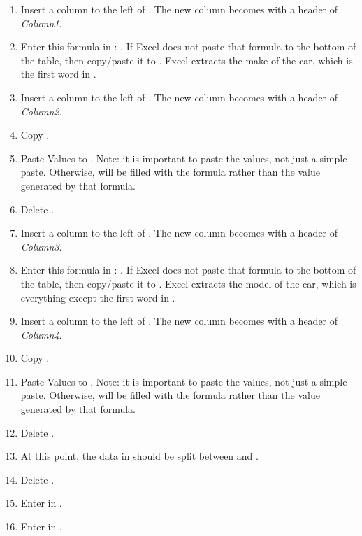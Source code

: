 \begin{enumerate}[resume]
	\begin{enumerate}
		\item Insert a column to the left of . The new column becomes  with a header of \textit{Column1}.
		\item Enter this formula in : . If Excel does not paste that formula to the bottom of the table, then copy/paste it to . Excel extracts the make of the car, which is the first word in .
		\item Insert a column to the left of . The new column becomes  with a header of \textit{Column2}.
		\item Copy .
		\item Paste Values to . Note: it is important to paste the values, not just a simple paste. Otherwise,  will be filled with the formula rather than the value generated by that formula.
		\item Delete .

		\item Insert a column to the left of . The new column becomes  with a header of \textit{Column3}.
		\item Enter this formula in : . If Excel does not paste that formula to the bottom of the table, then copy/paste it to . Excel extracts the model of the car, which is everything except the first word in .
		\item Insert a column to the left of . The new column becomes  with a header of \textit{Column4}.
		\item Copy .
		\item Paste Values to . Note: it is important to paste the values, not just a simple paste. Otherwise,  will be filled with the formula rather than the value generated by that formula.
		\item Delete .
		\item At this point, the data in  should be split between  and .
		\item Delete .
		\item Enter  in .
		\item Enter  in .


\end{enumerate}
\end{enumerate}
